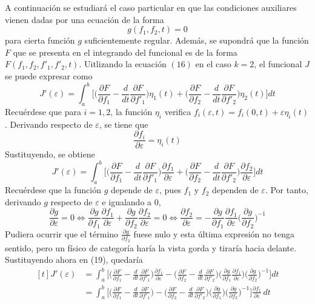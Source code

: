 \documentclass[12pt]{report}
\begin{document}
\vspace{2mm}
A continuación se estudiará el caso particular en que las condiciones auxiliares vienen dadas por una ecuación de la forma
\[g(f_1,f_2,t) = 0 \tag{18}\]
para cierta función $g$ suficientemente regular. Además, se supondrá que la función $F$ que se presenta en el integrando del funcional es de la forma $F(f_1,f_2,f'_1,f'_2,t)$. Uitlizando la ecuación $(16)$ en el caso $k = 2$, el funcional $J$ se puede expresar como
\[J'(\varepsilon) = \int_a^b \biggl[ \biggl( \frac{\partial F}{\partial f_1}-\frac{d}{dt} \frac{\partial F}{\partial f'_1} \biggr) \eta_1(t) + \biggl( \frac{\partial F}{\partial f_2}-\frac{d}{dt} \frac{\partial F}{\partial f'_2} \biggr) \eta_2(t) \biggr]dt\]
Recuérdese que para $i = 1,2$, la función $\eta_i$ verifica $f_i(\varepsilon,t) = f_i(0,t) + \varepsilon \eta_i(t)$.  Derivando respecto de $\varepsilon$, se tiene que 
\[\frac{\partial f_i}{\partial \varepsilon} = \eta_i(t)\]
Sustituyendo, se obtiene
\[J'(\varepsilon) = \int_a^b \biggl[ \biggl( \frac{\partial F}{\partial f_1}-\frac{d}{dt} \frac{\partial F}{\partial f'_1} \biggr) \frac{\partial f_1}{\partial \varepsilon} + \biggl( \frac{\partial F}{\partial f_2}-\frac{d}{dt} \frac{\partial F}{\partial f'_2} \biggr) \frac{\partial f_2}{\partial \varepsilon} \biggr]dt \tag{19}\]
Recuérdese que la función $g$ depende de $\varepsilon$, pues $f_1$ y $f_2$ dependen de $\varepsilon$. Por tanto, derivando $g$ respecto de $\varepsilon$ e igualando a $0$,
\[\frac{\partial g}{\partial \varepsilon} = 0 \iff \frac{\partial g}{\partial f_1}\frac{\partial f_1}{\partial \varepsilon} + \frac{\partial g}{\partial f_2}\frac{\partial f_2}{\partial \varepsilon} = 0 \iff \frac{\partial f_2}{\partial \varepsilon} = -\frac{\partial g}{\partial f_1}\frac{\partial f_1}{\partial \varepsilon} \biggl( \frac{\partial g}{\partial f_2} \biggr)^{-1}\]
Pudiera ocurrir que el término $\frac{\partial g}{\partial f_2}$ fuese nulo y esta última expresión no tenga sentido, pero un físico de categoría haría la vista gorda y tiraría hacia delante. Sustituyendo ahora en (19), quedaría
\[
\begin{aligned}[t]
J'(\varepsilon) &= \int_a^b \biggl[ \biggl( \frac{\partial F}{\partial f_1}-\frac{d}{dt} \frac{\partial F}{\partial f'_1} \biggr)\frac{\partial f_1}{\partial \varepsilon} - \biggl( \frac{\partial F}{\partial f_2}-\frac{d}{dt} \frac{\partial F}{\partial f'_2} \biggr) \biggl(\frac{\partial g}{\partial f_1}\frac{\partial f_1}{\partial \varepsilon} \biggr) \biggl( \frac{\partial g}{\partial f_2} \biggr)^{-1} \biggr]dt \\
&= \int_a^b \biggl[ \biggl( \frac{\partial F}{\partial f_1}-\frac{d}{dt} \frac{\partial F}{\partial f'_1} \biggr) - \biggl( \frac{\partial F}{\partial f_2}-\frac{d}{dt} \frac{\partial F}{\partial f'_2} \biggr) \biggl(\frac{\partial g}{\partial f_1} \biggr) \biggl( \frac{\partial g}{\partial f_2} \biggr)^{-1} \biggr]\frac{\partial f_1}{\partial \varepsilon} \, dt
\end{aligned}
\]
\end{document}

